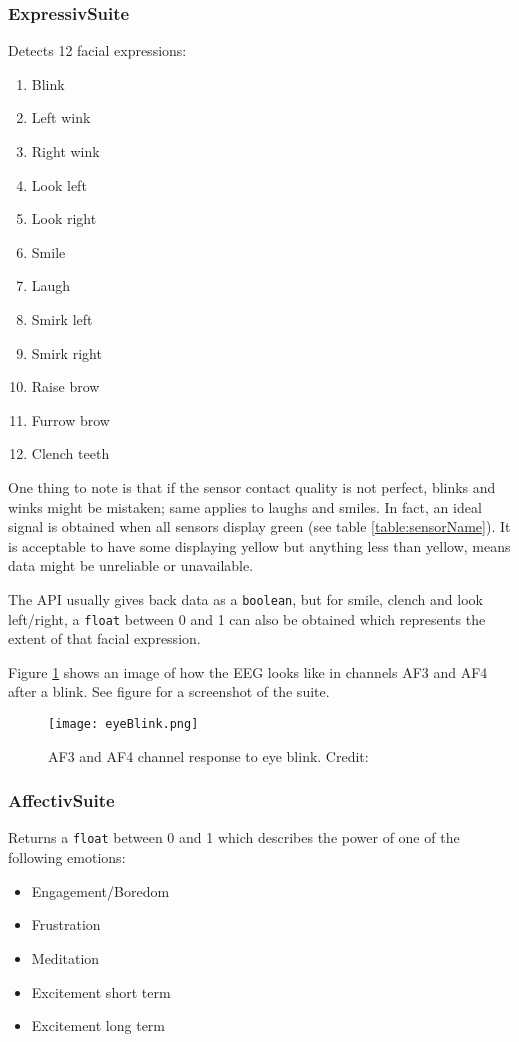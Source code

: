 \subsubsection{Expressiv\texttrademark  Suite}
Detects 12 facial expressions:
\begin{multicols}{2}
\begin{enumerate}
	\item Blink
	\item Left wink
	\item Right wink
	\item Look left
	\item Look right
	\item Smile
	\item Laugh
	\item Smirk left
	\item Smirk right
	\item Raise brow
	\item Furrow brow
	\item Clench teeth
\end{enumerate}
\end{multicols}
One thing to note is that if the sensor contact quality is not perfect, blinks and winks might be mistaken; same applies to laughs and smiles. In fact, an ideal signal is obtained when all sensors display green (see table \ref{table:sensorName}). It is acceptable to have some displaying yellow but anything less than yellow, means data might be unreliable or unavailable.
	
The API usually gives back data as a \texttt{boolean}, but for smile, clench and look left/right, a \texttt{float} between 0 and 1 can also be obtained which represents the extent of that facial expression. 

Figure \ref{fig:blinkAF} shows an image of how the EEG looks like in channels AF3 and AF4 after a blink. See figure for a screenshot of the suite.

\begin{figure}
  \centering
  \texttt{[image: eyeBlink.png]}
  \caption{AF3 and AF4 channel response to eye blink. Credit: \cite{experimenterEPOC}}
    \label{fig:blinkAF}           
\end{figure}

\subsubsection{Affectiv\texttrademark  Suite}
\label{part:affectiv}
Returns a \texttt{float} between 0 and 1 which describes the power of one of the following emotions:
\begin{itemize}
	\item Engagement/Boredom
	\item Frustration
	\item Meditation
	\item Excitement short term
	\item Excitement long term
\end{itemize}


